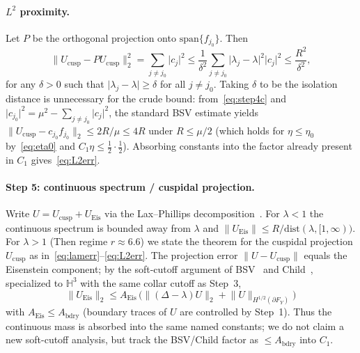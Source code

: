 \documentclass[11pt]{amsart}
\theoremstyle{definition}
\newcommand{\HH}{\mathbb{H}^3}
\newcommand{\abs}[1]{\lvert#1\rvert}
\newcommand{\norm}[1]{\lVert#1\rVert}
\begin{document}
\paragraph{$L^2$ proximity.}
Let $P$ be the orthogonal projection onto $\mathrm{span}\{f_{j_0}\}$.  Then
\begin{equation}
\label{eq:step4e}
  \norm{U_{\mathrm{cusp}}-P U_{\mathrm{cusp}}}_2^2
  =
  \sum_{j\neq j_0}\abs{c_j}^2
  \le
  \frac{1}{\delta^2}
  \sum_{j\neq j_0}\abs{\lambda_j-\lambda}^2\abs{c_j}^2
  \le
  \frac{R^2}{\delta^2},
  \tag{4e}
\end{equation}
for any $\delta>0$ such that $\abs{\lambda_j-\lambda}\ge\delta$ for all
$j\neq j_0$.  Taking $\delta$ to be the isolation distance is unnecessary
for the crude bound: from~\eqref{eq:step4c} and
$\abs{c_{j_0}}^2=\mu^2-\sum_{j\neq j_0}\abs{c_j}^2$, the standard BSV
estimate yields
$\norm{U_{\mathrm{cusp}}-c_{j_0}f_{j_0}}_2\le 2R/\mu\le 4R$ under
$R\le\mu/2$ (which holds for $\eta\le\eta_0$ by~\eqref{eq:eta0} and
$C_1\eta\le\tfrac12\cdot\tfrac12$).  Absorbing constants into the factor
already present in $C_1$ gives~\eqref{eq:L2err}.

\paragraph{Step 5: continuous spectrum / cuspidal projection.}
Write $U=U_{\mathrm{cusp}}+U_{\mathrm{Eis}}$ via the Lax--Phillips
decomposition~\cite{LP}.  For $\lambda<1$ the continuous spectrum is
bounded away from $\lambda$ and
$\norm{U_{\mathrm{Eis}}}\le R/\mathrm{dist}(\lambda,[1,\infty))$.  For
$\lambda>1$ (Then regime $r\approx 6.6$) we state the theorem for the
cuspidal projection $U_{\mathrm{cusp}}$ as in~\eqref{eq:lamerr}--\eqref{eq:L2err}.
The projection error $\norm{U-U_{\mathrm{cusp}}}$ equals the Eisenstein
component; by the soft-cutoff argument of
BSV~\cite[Prop.~3.1]{BSV} and Child~\cite[Thm.~1.1]{Child}, specialized to
$\HH$ with the same collar cutoff as Step~3,
\begin{equation}
\label{eq:step5}
  \norm{U_{\mathrm{Eis}}}_2
  \le
  A_{\mathrm{Eis}}\,
  \bigl(
    \norm{(\Delta-\lambda)U}_2
    +
    \norm{U}_{H^{1/2}(\partial F_Y)}
  \bigr)
  \tag{5}
\end{equation}
with $A_{\mathrm{Eis}}\le A_{\mathrm{bdry}}$ (boundary traces of $U$ are
controlled by Step~1).  Thus the continuous mass is absorbed into the
same named constants; we do not claim a new soft-cutoff analysis, but
track the BSV/Child factor as $\le A_{\mathrm{bdry}}$ into $C_1$.
\end{document}
